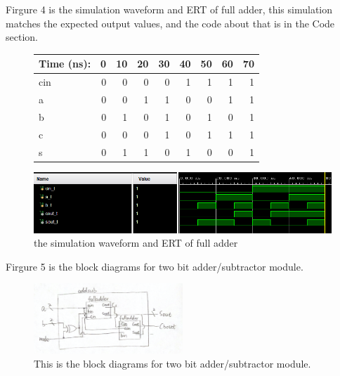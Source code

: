 \documentclass[11pt]{article}
\begin{document}
Firgure 4 is the simulation waveform and ERT of full adder, this simulation matches the expected output values, and the code about that is in the Code section. \\
\begin{figure}[ht]\centering
	\begin{tabular}{l|rrrr|rrrr}
		Time (ns): & 0 & 10 & 20 & 30 & 40 & 50 & 60 & 70\\
		\midrule
		cin & 0 & 0 & 0 & 0 & 1 & 1 & 1 & 1 \\
		a & 0 & 0 & 1 & 1 & 0 & 0 & 1 & 1 \\
		b & 0 & 1 & 0 & 1 & 0 & 1 & 0 & 1 \\
		\midrule
		c & 0 & 0 & 0 & 1 & 0 & 1 & 1 & 1 \\
		s & 0 & 1 & 1 & 0 & 1 & 0 & 0 & 1\\
		\bottomrule
	\end{tabular}\medskip
		
	\includegraphics[width=1\textwidth]{FullAdderSimulation}
	\caption{the simulation waveform and ERT of full adder}
	\label{fig:FullAdderSimulation}
\end{figure}

Firgure 5 is the block diagrams for two bit adder/subtractor module. \\
\begin{figure}[ht]\centering    
	\includegraphics[width=0.5\textwidth]{addsub}    
	\caption{This is the block diagrams for two bit adder/subtractor module.}    
	\label{fig:addsub}
\end{figure}
\end{document}

